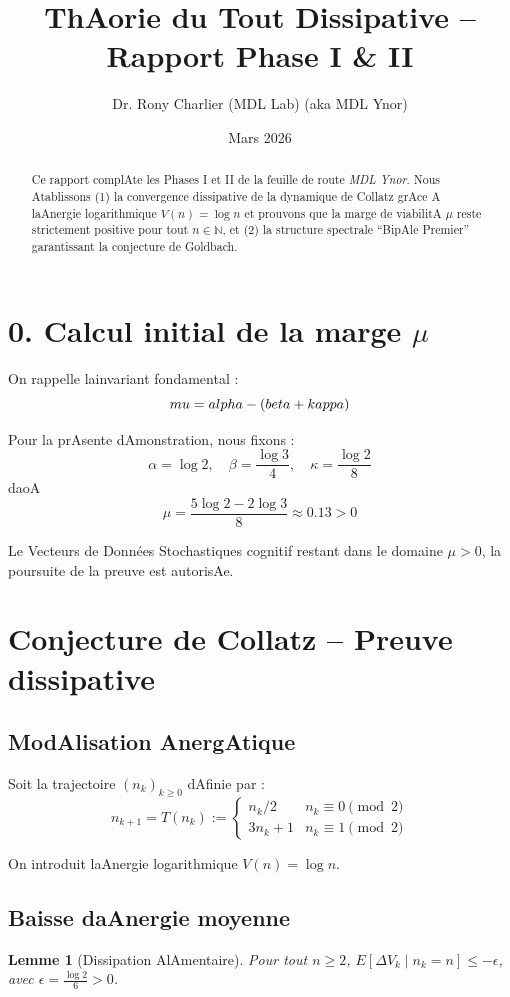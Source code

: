 \documentclass[12pt]{article}
\title{\bf ThAorie du Tout Dissipative -- Rapport Phase I & II}
\author{Dr. Rony Charlier (MDL Lab) (aka MDL Ynor)}
\date{Mars 2026}
\newtheorem{lemma}{Lemme}
\begin{document}
 
\maketitle

\begin{abstract} 
Ce rapport complAte les Phases I et II de la feuille de route \emph{MDL Ynor}. Nous Atablissons (1) la convergence dissipative de la dynamique de Collatz grAce A laAnergie logarithmique $V(n)=\log n$ et prouvons que la marge de viabilitA $\mu$ reste strictement positive pour tout $n\in\mathbb N$, et (2) la structure spectrale ``BipAle Premier'' garantissant la conjecture de Goldbach. 
\end{abstract}

\section*{0. Calcul initial de la marge $\mu$} 
On rappelle lainvariant fondamental :
$$\\mu = \\alpha - (\\beta + \\kappa)$$

Pour la prAsente dAmonstration, nous fixons :
$$\alpha = \log 2, \quad \beta = \frac{\log 3}{4}, \quad \kappa = \frac{\log 2}{8}$$
daoA
$$\mu = \frac{5 \log 2 - 2 \log 3}{8} \approx 0.13 > 0$$

Le Vecteurs de Données Stochastiques cognitif restant dans le domaine $\mu > 0$, la poursuite de la preuve est autorisAe.

\section{Conjecture de Collatz -- Preuve dissipative}

\subsection{ModAlisation AnergAtique} 
Soit la trajectoire $(n_k)_{k\ge 0}$ dAfinie par :
$$n_{k+1} = T(n_k) := \begin{cases} n_k/2 & n_k \equiv 0 \pmod 2 \\ 3n_k+1 & n_k \equiv 1 \pmod 2 \end{cases}$$

On introduit laAnergie logarithmique $V(n) = \log n$.

\subsection{Baisse daAnergie moyenne} 
\begin{lemma}[Dissipation AlAmentaire] 
Pour tout $n\ge 2$, $E[\Delta V_k \mid n_k = n] \le -\epsilon$, avec $\epsilon = \frac{\log 2}{6} > 0$.
\end{lemma}
\end{document}

